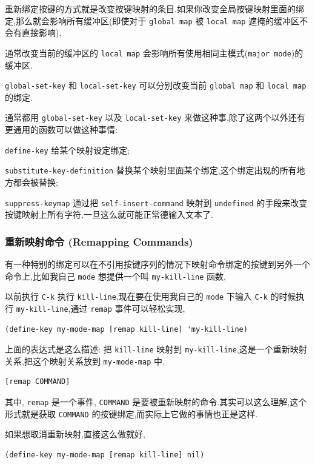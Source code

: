 \documentclass[11pt]{article}
\begin{document}
重新绑定按键的方式就是改变按键映射的条目.如果你改变全局按键映射里面的绑定,那么就会影响所有缓冲区(即使对于 \texttt{global map} 被 \texttt{local map} 遮掩的缓冲区不会有直接影响).

通常改变当前的缓冲区的 \texttt{local map} 会影响所有使用相同主模式(\texttt{major mode})的缓冲区.

\texttt{global-set-key} 和 \texttt{local-set-key} 可以分别改变当前 \texttt{global map} 和 \texttt{local map} 的绑定.

通常都用 \texttt{global-set-key} 以及 \texttt{local-set-key} 来做这种事,除了这两个以外还有更通用的函数可以做这种事情:

\texttt{define-key} 给某个映射设定绑定;

\texttt{substitute-key-definition} 替换某个映射里面某个绑定,这个绑定出现的所有地方都会被替换;

\texttt{suppress-keymap} 通过把 \texttt{self-insert-command} 映射到 \texttt{undefined} 的手段来改变按键映射上所有字符,一旦这么就可能正常德输入文本了.


\subsubsection{重新映射命令 (Remapping Commands)}
\label{sec:orgc75897d}

有一种特别的绑定可以在不引用按键序列的情况下映射命令绑定的按键到另外一个命令上,比如我自己 \texttt{mode} 想提供一个叫 \texttt{my-kill-line} 函数,

以前执行 \texttt{C-k} 执行 \texttt{kill-line},现在要在使用我自己的 \texttt{mode} 下输入 \texttt{C-k} 的时候执行 \texttt{my-kill-line},通过 \texttt{remap} 事件可以轻松实现,

\begin{verbatim}
(define-key my-mode-map [remap kill-line] 'my-kill-line)
\end{verbatim}

上面的表达式是这么描述: 把 \texttt{kill-line} 映射到 \texttt{my-kill-line},这是一个重新映射关系,把这个映射关系放到 \texttt{my-mode-map} 中.

\begin{verbatim}
[remap COMMAND]
\end{verbatim}

其中, \texttt{remap} 是一个事件, \texttt{COMMAND} 是要被重新映射的命令.其实可以这么理解,这个形式就是获取 \texttt{COMMAND} 的按键绑定,而实际上它做的事情也正是这样.

如果想取消重新映射,直接这么做就好,

\begin{verbatim}
(define-key my-mode-map [remap kill-line] nil)
\end{verbatim}
\end{document}
